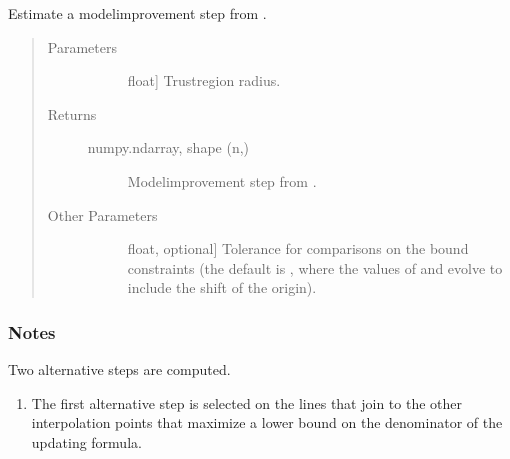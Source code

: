 \documentclass[letterpaper,10pt,english]{sphinxmanual}
\begin{document}
\begin{fulllineitems}
\begin{fulllineitems}
\label{\detokenize{refs/generated/cobyqa.optimize.TrustRegion.model_step:cobyqa.optimize.TrustRegion.model_step}}
\sphinxAtStartPar
Estimate a model\sphinxhyphen{}improvement step from .
\begin{quote}\begin{description}
\item[{Parameters}] \leavevmode\begin{description}
\item[{}] \leavevmode{[}float{]}
\sphinxAtStartPar
Trust\sphinxhyphen{}region radius.

\end{description}

\item[{Returns}] \leavevmode\begin{description}
\item[{numpy.ndarray, shape (n,)}] \leavevmode
\sphinxAtStartPar
Model\sphinxhyphen{}improvement step from .

\end{description}

\item[{Other Parameters}] \leavevmode\begin{description}
\item[{}] \leavevmode{[}float, optional{]}
\sphinxAtStartPar
Tolerance for comparisons on the bound constraints (the default is
, where the
values of  and  evolve to include the shift of the
origin).

\end{description}

\end{description}\end{quote}
\subsubsection*{Notes}

\sphinxAtStartPar
Two alternative steps are computed.
\begin{enumerate}
%
\item {} 
\sphinxAtStartPar
The first alternative step is selected on the lines that join
 to the other interpolation points that maximize a lower
bound on the denominator of the updating formula.


\end{enumerate}
\end{fulllineitems}
\end{fulllineitems}
\end{document}
